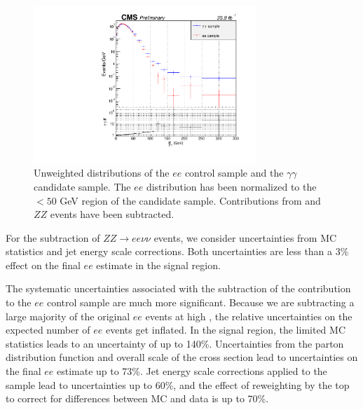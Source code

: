 \begin{figure}[h]
\begin{center}
\includegraphics[width=0.75\textwidth]{Figures/Appendix/compare_ee_gg_unweighted.pdf}
\end{center}
\caption[Unweighted \ETmiss distributions of the $ee$ control sample and the $\gamma\gamma$ candidate sample.]
{Unweighted \ETmiss distributions of the $ee$ control sample and the $\gamma\gamma$ candidate sample.
The $ee$ distribution has been normalized to the \ETmiss$<50$ GeV region of the candidate sample. Contributions 
from \ttbar and $ZZ$ events have been subtracted.}
\label{fig:eeUnweighted}
\end{figure}


For the subtraction of $ZZ \rightarrow ee\nu\nu$ events, 
we consider uncertainties from
MC statistics and jet energy scale corrections.
Both uncertainties are less than a 3\% effect
on the final $ee$ estimate in the signal region.

The systematic uncertainties associated with 
the subtraction of the \ttbar contribution to the $ee$ control
sample are much more significant. 
Because we are subtracting a large majority of the
original $ee$ events at high \ETmiss, the relative
uncertainties on the expected number of $ee$ events get inflated.
In the signal region, the limited MC \ttbar statistics
leads to an uncertainty of up to 140\%. Uncertainties
from the parton distribution function and overall
scale of the cross section lead to uncertainties
on the final $ee$ estimate up to 73\%.
Jet energy scale corrections
applied to the \ttbar sample lead to uncertainties up to
60\%, and the effect of reweighting by the
top \pt to correct for differences between
MC and data is up to 70\%.

